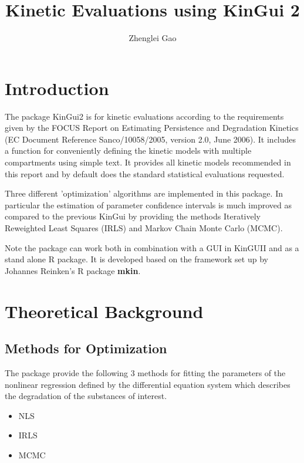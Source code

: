 \documentclass{article}
\begin{document}


\title{Kinetic Evaluations using KinGui 2}
\author{Zhenglei Gao}
\maketitle
\section{Introduction}

The package KinGui2 is for kinetic evaluations according to the
requirements given by the FOCUS Report on Estimating Persistence and
Degradation Kinetics (EC Document Reference Sanco/10058/2005, version
2.0, June 2006). It includes a function for conveniently defining the
kinetic models with multiple compartments using simple text. It
provides all kinetic models recommended in this report and by default
does the standard statistical evaluations requested.

Three different 'optimization' algorithms are implemented in this
package. In particular the estimation of parameter confidence
intervals is much improved as compared to the previous KinGui by
providing the methods Iteratively Reweighted Least Squares (IRLS) and
Markov Chain Monte Carlo (MCMC).

Note the package can work both in combination with a GUI in KinGUII and as a
stand alone R package. It is developed based on the framework set up
by Johannes Reinken's R package \textbf{mkin}.

\section{Theoretical Background}
\subsection{Methods for Optimization}
The package provide the following 3 methods for fitting the parameters of the
nonlinear regression defined by the differential equation system which
describes the degradation of the substances of interest.
\begin{itemize}
\item NLS
\item IRLS \cite{gao_improving_2011}
\item MCMC \cite{goerlitz_statistical_2011}
\end{itemize}
\end{document}
